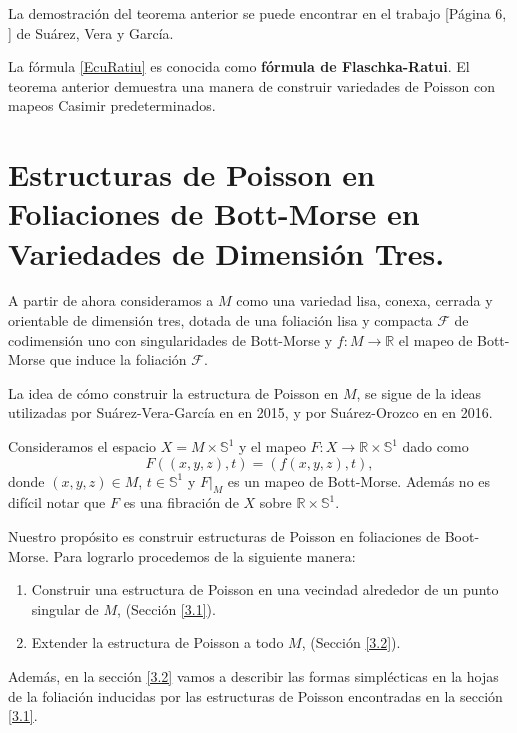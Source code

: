 \documentclass[a4paper,10pt]{book}
\begin{document}
La demostraci\'on del teorema anterior se puede encontrar en el trabajo [P\'agina 6, \cite{GSV}] de Su\'arez, Vera y Garc\'ia.
\vspace{5mm}

La f\'ormula \ref{EcuRatiu} es conocida como {\bfseries f\'ormula de Flaschka-Ratui}. El teorema anterior demuestra una manera de construir variedades de Poisson con mapeos Casimir predeterminados. 

\chapter{Estructuras de Poisson en Foliaciones de Bott-Morse en Variedades de Dimensi\'on Tres.}\label{cap3} %
\label{ch:sobre}

A partir de ahora consideramos a $M$ como una variedad lisa, conexa, cerrada y orientable de dimensi\'on tres, dotada de una foliaci\'on lisa y compacta $\mathcal{F}$ de codimensi\'on uno con singularidades de Bott-Morse y $f:M\to\mathbb{R}$ el mapeo de Bott-Morse que induce la foliaci\'on $\mathcal{F}$.
\vspace{5mm}

La idea de c\'omo construir la estructura de Poisson en $M$, se sigue de la ideas utilizadas por Su\'arez-Vera-Garc\'ia en \cite{GSV} en 2015, y por Su\'arez-Orozco en \cite{SO} en 2016.
\vspace{5mm}

Consideramos el espacio $X=M\times\mathbb{S}^{1}$ y el mapeo $F:X\to\mathbb{R}\times\mathbb{S}^{1}$ dado como 
$$F((x,y,z),t)=(f(x,y,z),t),$$
donde $(x,y,z)\in M$, $t\in\mathbb{S}^{1}$ y $F|_{M}$ es un mapeo de Bott-Morse. Adem\'as no es dif\'icil notar que $F$ es una fibraci\'on de $X$ sobre $\mathbb{R}\times\mathbb{S}^{1}$.
\vspace{5mm}
 
Nuestro prop\'osito es construir estructuras de Poisson en foliaciones de Boot-Morse. Para lograrlo procedemos de la siguiente manera:
\begin{enumerate}
    \item Construir una estructura de Poisson en una vecindad alrededor de un punto singular de $M$, (Secci\'on \ref{3.1}).  
    \item Extender la estructura de Poisson a todo $M$, (Secci\'on \ref{3.2}).  
\end{enumerate}
Adem\'as, en la secci\'on \ref{3.2} vamos a describir las formas simpl\'ecticas en la hojas de la foliaci\'on inducidas por las estructuras de Poisson encontradas en la secci\'on \ref{3.1}. 
\end{document}
